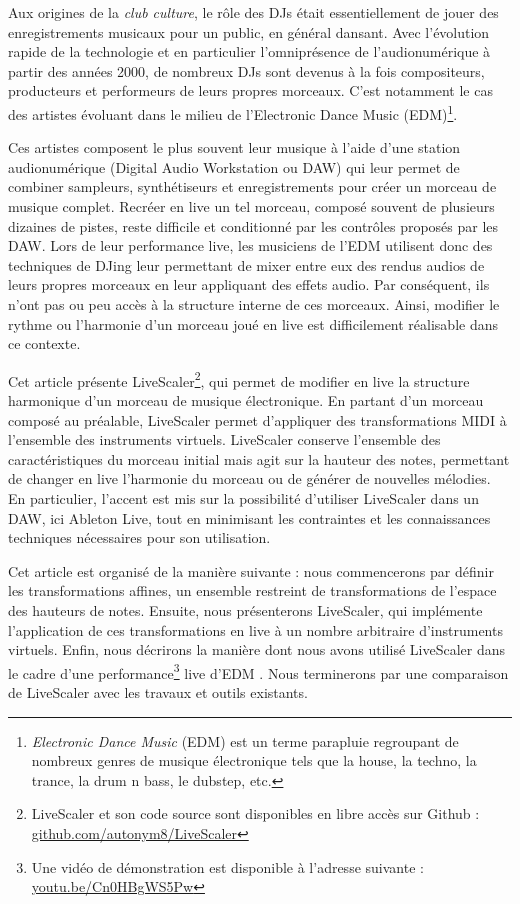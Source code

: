 Aux origines de la \emph{club culture}, le rôle des DJs était essentiellement de jouer des enregistrements musicaux pour un public, en général dansant. Avec l’évolution rapide de la technologie et en particulier l’omniprésence de l’audionumérique à partir des années 2000, de nombreux DJs sont devenus à la fois compositeurs, producteurs et performeurs de leurs propres morceaux. C'est notamment le cas des artistes évoluant dans le milieu de l'Electronic Dance Music (EDM)\footnote{\emph{Electronic Dance Music} (EDM) est un terme parapluie regroupant de nombreux genres de musique électronique tels que la house, la techno, la trance, la drum n bass, le dubstep, etc. }.


Ces artistes composent le plus souvent leur musique à l’aide d’une station audionumérique (Digital Audio Workstation ou DAW) qui leur permet de combiner sampleurs, synthétiseurs et enregistrements pour créer un morceau de musique complet. Recréer en live un tel morceau, composé souvent de plusieurs dizaines de pistes, reste difficile et conditionné par les contrôles proposés par les DAW. Lors de leur performance live, les musiciens de l'EDM utilisent donc des techniques de DJing leur per\-mettant de mixer entre eux des rendus audios de leurs propres morceaux en leur appliquant des effets audio. Par conséquent, ils n’ont pas ou peu accès à la structure interne de ces morceaux. Ainsi, modifier le rythme ou l'harmonie d’un morceau joué en live est difficilement réalisable dans ce contexte.

Cet article présente LiveScaler\footnote{LiveScaler et son code source sont disponibles en libre accès sur Github : \href{https://github.com/autonym8/LiveScaler}{github.com/autonym8/LiveScaler}}, qui per\-met de modifier en live la structure harmonique d'un morceau de musique électronique. En partant d'un morceau composé au préalable, Live\-Scaler permet d'appliquer des transformations MIDI à l'ensemble des instruments virtuels. LiveScaler conserve l'ensemble des caractéristiques du morceau initial mais agit sur la hauteur des notes, permettant de changer en live l'harmonie du morceau ou de générer de nouvelles mélodies. En particulier, l'accent est mis sur la possibilité d'utiliser LiveScaler dans un DAW, ici Ableton Live, tout en minimisant les contraintes et les connaissances techniques nécessaires pour son utilisation.

Cet article est organisé de la manière suivante : nous commencerons par définir les transformations affines, un ensemble restreint de transformations de l'espace des hauteurs de notes. Ensuite, nous présenterons Live\-Scaler, qui implémente l'application de ces transformations en live à un nombre arbitraire d'instruments virtuels. Enfin, nous décrirons la manière dont nous avons utilisé LiveScaler dans le cadre d'une performance\footnote{Une vidéo de démonstration est disponible à l'adresse suivante : \href{ https://youtu.be/Cn0HBgWS5Pw}{youtu.be/Cn0HBgWS5Pw}} live d'EDM . Nous terminerons par une comparaison de LiveScaler avec les travaux et outils existants.